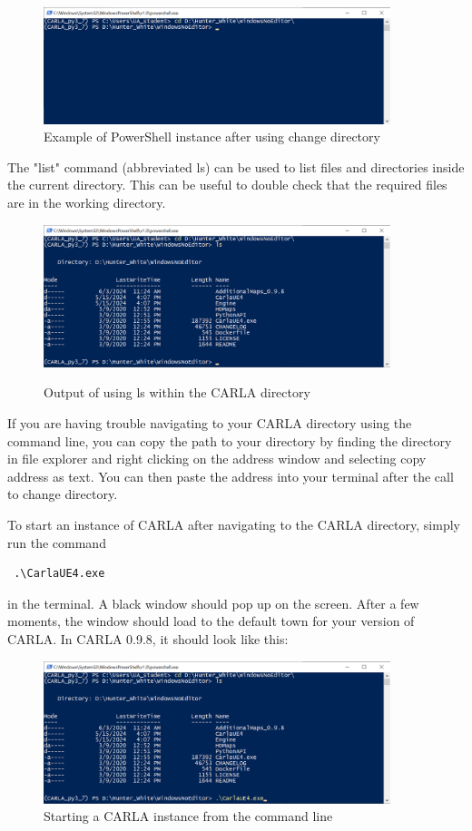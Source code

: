 \documentclass[12pt,oneside,letterpaper]{article}
\begin{document}
\begin{figure}[h]
\centering
\includegraphics[width=0.9\textwidth, trim=0cm 4.5cm 0cm 0cm, clip]{Command_Prompt_3}
\caption{Example of PowerShell instance after using change directory}
\label{fig:com_prompt3}
\end{figure}

The "list" command (abbreviated ls) can be used to list files and directories inside the current directory. This can be useful to double check that the required files are in the working directory.

\begin{figure}[h]
\centering
\includegraphics[width=0.9\textwidth]{Command_Prompt_4}
\label{fig:com_prompt4}
\caption{Output of using ls within the CARLA directory}
\end{figure}

If you are having trouble navigating to your CARLA directory using the command line, you can copy the path to your directory by finding the directory in file explorer and right clicking on the address window and selecting copy address as text. You can then paste the address into your terminal after the call to change directory.

To start an instance of CARLA after navigating to the CARLA directory, simply run the command \begin{verbatim} .\CarlaUE4.exe \end{verbatim} in the terminal. A black window should pop up on the screen. After a few moments, the window should load to the default town for your version of CARLA. In CARLA 0.9.8, it should look like this:
\begin{figure}[h]
\centering
\includegraphics[width=0.9\textwidth]{Command_Prompt_5}
\caption{Starting a CARLA instance from the command line}
\label{fig:com_prompt5}
\end{figure}
\end{document}
